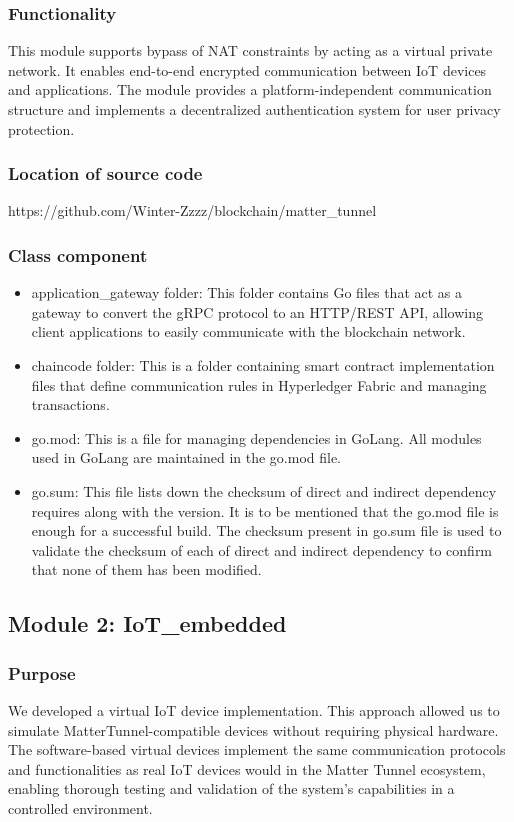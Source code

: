 \documentclass[conference]{IEEEtran}
\begin{document}
\subsubsection{Functionality}
This module supports bypass of NAT constraints by acting as a virtual private network. It enables end-to-end encrypted communication between IoT devices and applications. The module provides a platform-independent communication structure and implements a decentralized authentication system for user privacy protection.

\subsubsection{Location of source code}
https://github.com/Winter-Zzzz/blockchain/matter\_tunnel

\subsubsection{Class component}
\begin{itemize}
	\item application\_gateway folder: This folder contains Go files that act as a gateway to convert the gRPC protocol to an HTTP/REST API, allowing client applications to easily communicate with the blockchain network.
	\item chaincode folder: This is a folder containing smart contract implementation files that define communication rules in Hyperledger Fabric and managing transactions.
	\item go.mod: This is a file for managing dependencies in GoLang. All modules used in GoLang are maintained in the go.mod file.
	\item go.sum: This file lists down the checksum of direct and indirect dependency requires along with the version. It is to be mentioned that the go.mod file is enough for a successful build. The checksum present in go.sum file is used to validate the checksum of each of direct and indirect dependency to confirm that none of them has been modified.
\end{itemize}

\subsection{Module 2: IoT\_embedded}

\subsubsection{Purpose}
We developed a virtual IoT device implementation. This approach allowed us to simulate MatterTunnel-compatible devices without requiring physical hardware. The software-based virtual devices implement the same communication protocols and functionalities as real IoT devices would in the Matter Tunnel ecosystem, enabling thorough testing and validation of the system's capabilities in a controlled environment.
\end{document}
